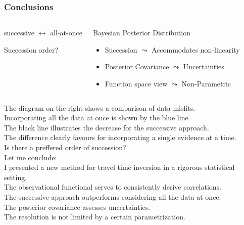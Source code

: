 \documentclass[aspectratio=169, t, 10pt,
    ]{beamer}
\begin{document}
\begin{frame}
    \frametitle{Conclusions}

\begin{columns}
%

    \begin{center}
        successive $\leftrightarrow$ all-at-once

        Succession order?
    \end{center}

    \begin{exampleblock}{Bayesian Posterior Distribution}
    \begin{itemize}
        \item Succession \hfill $\leadsto$ \hfill Accommodates non-linearity
        \item Posterior Covariance \hfill $\leadsto$ \hfill Uncertainties
        \item Function space view \hfill $\leadsto$ \hfill Non-Parametric
    \end{itemize}
    \end{exampleblock}


    \vspace{-6mm}
    \centering
    \only{}
\end{columns}

\end{frame}

The diagram on the right shows a comparison of data misfits.
\\
Incorporating all the data at once is shown by the blue line.
\\
The black line illustrates the decrease for the successive approach.
\\
The difference clearly favours for incorporating a single evidence at a time.
\\
Is there a preffered order of succession?
\\[2mm]

Let me conclude:
\\
I presented a new method for travel time inversion in a rigorous statistical setting.
\\
The observational functional serves to consistently derive correlations.
\\
The successive approach outperforms considering all the data at once.
\\
The posterior covariance assesses uncertainties.
\\
The resolution is not limited by a certain parametrization.
\end{document}
